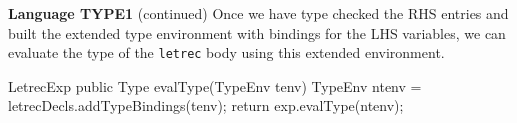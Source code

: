 \begin{minipage}[t]{\sw}
\slidenumber
\LARGE
{\bf Language TYPE1} (continued)\exx
Once we have type checked the RHS entries
and built the extended type environment with bindings
for the LHS variables,
we can evaluate the type of the \verb'letrec' body
using this extended environment.
\Large
\begin{qv}
LetrecExp
    public Type evalType(TypeEnv tenv) {
        TypeEnv ntenv = letrecDecls.addTypeBindings(tenv);
        return exp.evalType(ntenv);
    }
\end{qv}
\end{minipage}
